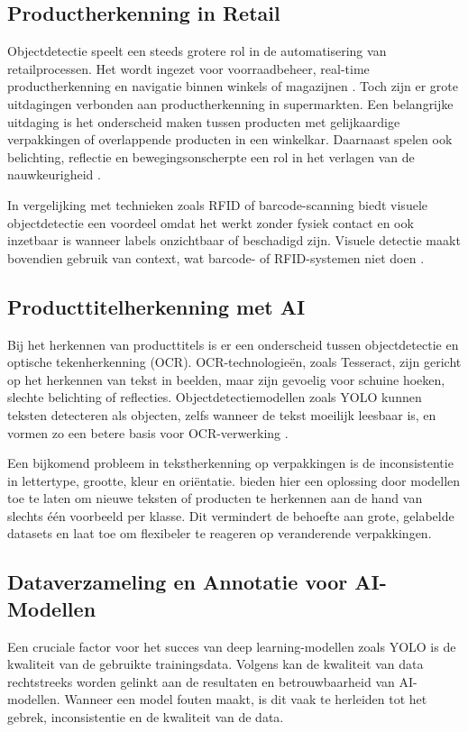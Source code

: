 \subsection{Productherkenning in Retail}
Objectdetectie speelt een steeds grotere rol in de automatisering van retailprocessen. Het wordt ingezet voor voorraadbeheer, real-time productherkenning en navigatie binnen winkels of magazijnen \autocite{Cai2021}. Toch zijn er grote uitdagingen verbonden aan productherkenning in supermarkten. Een belangrijke uitdaging is het onderscheid maken tussen producten met gelijkaardige verpakkingen of overlappende producten in een winkelkar. Daarnaast spelen ook belichting, reflectie en bewegingsonscherpte een rol in het verlagen van de nauwkeurigheid \autocite{Cai2021}.

In vergelijking met technieken zoals RFID of barcode-scanning biedt visuele objectdetectie een voordeel omdat het werkt zonder fysiek contact en ook inzetbaar is wanneer labels onzichtbaar of beschadigd zijn. Visuele detectie maakt bovendien gebruik van context, wat barcode- of RFID-systemen niet doen \autocite{Desmarescaux2025}.

\subsection{Producttitelherkenning met AI}
Bij het herkennen van producttitels is er een onderscheid tussen objectdetectie en optische tekenherkenning (OCR). OCR-technologieën, zoals Tesseract, zijn gericht op het herkennen van tekst in beelden, maar zijn gevoelig voor schuine hoeken, slechte belichting of reflecties. Objectdetectiemodellen zoals YOLO kunnen teksten detecteren als objecten, zelfs wanneer de tekst moeilijk leesbaar is, en vormen zo een betere basis voor OCR-verwerking \autocite{Desmarescaux2025}.

Een bijkomend probleem in tekstherkenning op verpakkingen is de inconsistentie in lettertype, grootte, kleur en oriëntatie. \textcite{Desmarescaux2025} bieden hier een oplossing door modellen toe te laten om nieuwe teksten of producten te herkennen aan de hand van slechts één voorbeeld per klasse. Dit vermindert de behoefte aan grote, gelabelde datasets en laat toe om flexibeler te reageren op veranderende verpakkingen.

\subsection{Dataverzameling en Annotatie voor AI-Modellen}
Een cruciale factor voor het succes van deep learning-modellen zoals YOLO is de kwaliteit van de gebruikte trainingsdata. Volgens \textcite{Bertossi2020} kan de kwaliteit van data rechtstreeks worden gelinkt aan de resultaten en betrouwbaarheid van AI-modellen. Wanneer een model fouten maakt, is dit vaak te herleiden tot het gebrek, inconsistentie en de kwaliteit van de data.

